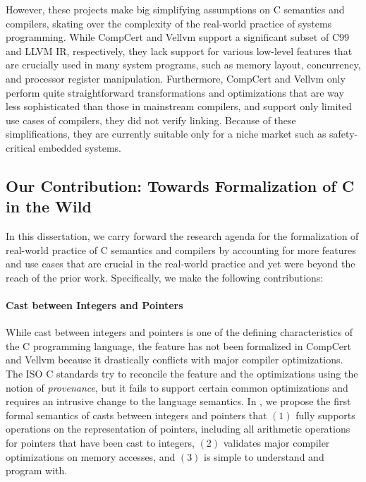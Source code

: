 
However, these projects make big simplifying assumptions on C semantics and compilers, skating over
the complexity of the real-world practice of systems programming.  While CompCert and Vellvm support
a significant subset of C99 and LLVM IR, respectively, they lack support for various low-level
features that are crucially used in many system programs, such as memory layout, concurrency, and
processor register manipulation.  Furthermore, CompCert and Vellvm only perform quite
straightforward transformations and optimizations that are way less sophisticated than those in
mainstream compilers, and support only limited use cases of compilers, \eg{} they did not verify
linking.  Because of these simplifications, they are currently suitable only for a niche market such
as safety-critical embedded systems.





\subsection{Our Contribution: Towards Formalization of C in the Wild}

In this dissertation, we carry forward the research agenda for the formalization of real-world
practice of C semantics and compilers by accounting for more features and use cases that are crucial
in the real-world practice and yet were beyond the reach of the prior work.  Specifically, we make
the following contributions:



%
\paragraph{Cast between Integers and Pointers}

While cast between integers and pointers is one of the defining characteristics of the C programming
language, the feature has not been formalized in CompCert and Vellvm because it drastically
conflicts with major compiler optimizations.  The ISO C standards try to reconcile the feature and
the optimizations using the notion of \emph{provenance}, but it fails to support certain common
optimizations and requires an intrusive change to the language semantics.  In
, we propose the first formal semantics of casts between integers and pointers
that $(1)$ fully supports operations on the representation of pointers, including all arithmetic
operations for pointers that have been cast to integers, $(2)$ validates major compiler
optimizations on memory accesses, and $(3)$ is simple to understand and program with.

